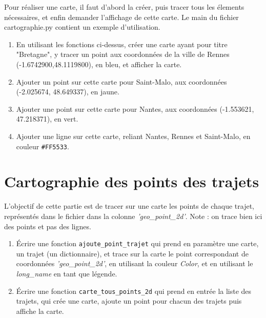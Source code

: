 \documentclass[11pt,a4paper]{article}
\begin{document}
\vspace{1em}
Pour réaliser une carte, il faut d'abord la créer, puis tracer tous les élements nécessaires, et enfin demander l'affichage de cette carte.
Le main du fichier cartographie.py contient un exemple d'utilisation.

\begin{enumerate}
\item En utilisant les fonctions ci-dessus, créer une carte ayant pour titre "Bretagne", y tracer un point aux coordonnées de la ville de Rennes (-1.6742900,48.1119800), en bleu, et afficher la carte.
\item Ajouter un point sur cette carte pour Saint-Malo, aux coordonnées (-2.025674, 48.649337), en jaune.
\item Ajouter une point sur cette carte pour Nantes, aux coordonnées (-1.553621, 47.218371), en vert.
\item Ajouter une ligne sur cette carte, reliant Nantes, Rennes et Saint-Malo, en couleur \verb+#FF5533+.
\end{enumerate}

\section{Cartographie des points des trajets}
L'objectif de cette partie est de tracer sur une carte les points de chaque trajet, représentés dans le fichier dans la colonne \emph{'geo\_point\_2d'}. Note : on trace bien ici des points et pas des lignes.

\begin{enumerate}
    \item Écrire une fonction \verb+ajoute_point_trajet+ qui prend en paramètre une carte, un trajet (un dictionnaire), et trace sur la carte le point 
    correspondant de coordonnées \emph{'geo\_point\_2d'}, en utilisant la couleur \emph{Color}, et en utilisant le \emph{long\_name} en tant que légende.
    \item Écrire une fonction \verb+carte_tous_points_2d+ qui prend en entrée la liste des trajets, qui crée une carte, ajoute un point pour chacun des trajets puis affiche la carte.
\end{enumerate}
\end{document}
